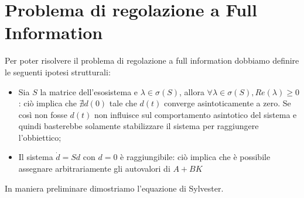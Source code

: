 \documentclass{article}
\theoremstyle{definition}
\begin{document}
\section*{Problema di regolazione a Full Information}
Per poter risolvere il problema di regolazione a full information dobbiamo definire le seguenti ipotesi strutturali:\begin{itemize}
    \item Sia \(S\) la matrice dell'esosistema e \(\lambda\in\sigma{(S)}\), allora \(\forall\lambda\in\sigma{(S)},Re(\lambda)\geq 0\): ciò implica che \(\nexists d(0) \) tale che \(d(t)\) converge asintoticamente a zero. Se così non fosse \(d(t)\) non influisce sul comportamento asintotico del sistema e quindi basterebbe solamente stabilizzare il sistema per raggiungere l'obbiettico;
    \item Il sistema \(\dot{d}=Sd\) con \(d=0\) è raggiungibile: ciò implica che è possibile assegnare arbitrariamente gli autovalori di \(A+BK\)
\end{itemize}
In maniera preliminare dimostriamo l'equazione di Sylvester.
\end{document}
